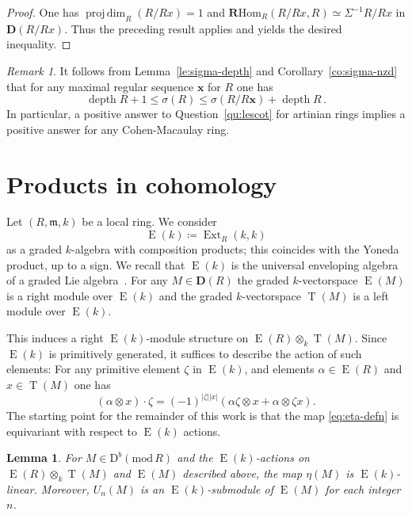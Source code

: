 \documentclass{amsart}
\numberwithin{equation}{section}
\theoremstyle{plain}
\newtheorem{lemma}[equation]{Lemma}
\theoremstyle{definition}
\theoremstyle{remark}
\newtheorem{remark}[equation]{Remark}
\newcommand{\dbcat}[1]{\mathrm{D}^b(\mathrm{mod}\,{#1})}
\newcommand{\dcat}{\mathbf{D}}
\newcommand{\depth}{\operatorname{depth}}
\newcommand{\eee}{\operatorname{E}}
\newcommand{\ext}{\operatorname{Ext}}
\newcommand{\projdim}{\operatorname{proj\,dim}}
\newcommand{\rhom}{\mathbf{R}\mathrm{Hom}}
\newcommand{\tee}{\operatorname{T}}
\newcommand{\fm}{\mathfrak{m}}
\begin{document}
\begin{proof}
One has $\projdim_R(R/Rx)=1$ and $\rhom_R(R/Rx,R)\simeq \Sigma^{-1}R/Rx$ in $\dcat(R/Rx)$. Thus the preceding result applies and yields the desired inequality.
\end{proof}

\begin{remark}
It follows from Lemma~\ref{le:sigma-depth} and Corollary~\ref{co:sigma-nzd} that for any maximal regular sequence $\boldsymbol{x}$ for $R$ one has
\[
\depth R+1 \le \sigma(R)\le \sigma(R/R\boldsymbol{x}) + \depth R\,.
\]
In particular, a positive answer to Question~\ref{qu:lescot} for artinian rings implies a positive answer for any Cohen-Macaulay ring.
\end{remark}

 \section{Products in cohomology}
 \label{se:products}
 Let $(R,\fm,k)$ be a local ring. We consider 
 \[
 \eee(k)\coloneqq\ext_R(k,k)
 \]
 as a graded $k$-algebra with composition products; this coincides with the Yoneda product, up to a sign. We recall that $\eee(k)$ is the universal enveloping algebra of a graded Lie algebra~\cite[Section~10]{Avramov:1998a}. For any $M\in \dcat(R)$ the graded $k$-vectorspace $\eee(M)$ is a right module over $\eee(k)$ and the graded $k$-vectorspace $\tee(M)$ is a left module over $\eee(k)$. 

 This induces a right $\eee(k)$-module structure on $\eee(R)\otimes_k\tee(M)$. Since $\eee(k)$ is primitively generated, it suffices to describe the action of such elements: For any primitive element $\zeta$ in $\eee(k)$, and elements $\alpha\in\eee(R)$ and $x\in\tee(M)$ one has
 \begin{equation}
 \label{eq:diagonal}
 (\alpha\otimes x)\cdot \zeta = (-1)^{|\zeta||x|} (\alpha\zeta\otimes x + \alpha\otimes \zeta x).   
 \end{equation}
 The starting point for the remainder of this work is that the map \eqref{eq:eta-defn} is equivariant with respect to $\eee(k)$ actions.

\begin{lemma}
\label{le:equivariance}
For $M\in \dbcat{R}$ and the $\eee(k)$-actions on $\eee(R)\otimes_k\tee(M)$ and $\eee(M)$ described above, the map $\eta(M)$ is $\eee(k)$-linear. Moreover,  $U_n(M)$ is an $\eee(k)$-submodule of $\eee(M)$ for each integer $n$.
\end{lemma}
\end{document}
